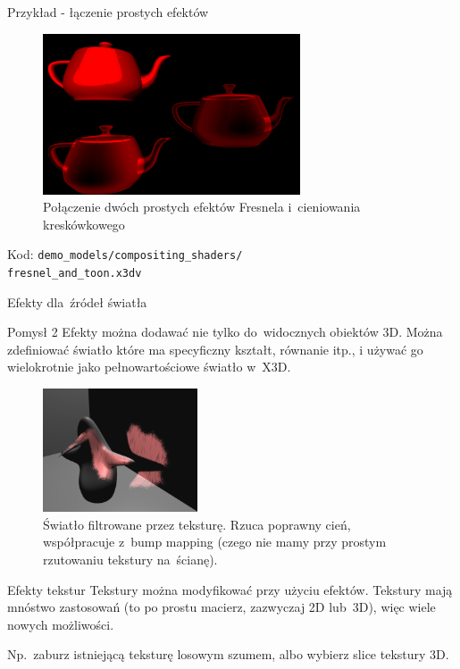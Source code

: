 \documentclass{beamer}
\begin{document}
\begin{frame}{Przykład - łączenie prostych efektów}
\begin{figure}
  \centering
  \includegraphics[width=3.0in]{../fresnel_and_toon}
  \caption{Połączenie dwóch prostych efektów Fresnela i~cieniowania kreskówkowego}
\end{figure}

Kod: \texttt{demo\_models/compositing\_shaders/\\fresnel\_and\_toon.x3dv}

\end{frame}

\begin{frame}{Efekty dla~źródeł światła}
\begin{block}{Pomysł 2}
Efekty można dodawać nie tylko do~widocznych obiektów 3D.
Można zdefiniować światło które ma specyficzny kształt, równanie itp.,
i używać go wielokrotnie jako pełnowartościowe światło w~X3D.
\end{block}

\begin{figure}
  \centering
  \includegraphics[width=1.8in]{../fancy_light_spot_shape}
  \caption{Światło filtrowane przez teksturę. Rzuca poprawny cień, współpracuje z~bump mapping (czego nie mamy przy prostym rzutowaniu tekstury na~ścianę).}
\end{figure}
\end{frame}

\begin{frame}[fragile]{Efekty tekstur}
Tekstury można modyfikować przy użyciu efektów. Tekstury mają mnóstwo
zastosowań (to po prostu macierz, zazwyczaj 2D lub~3D), więc wiele nowych
możliwości.

\vspace{0.1in}

Np.~zaburz istniejącą teksturę losowym szumem, albo wybierz slice tekstury 3D.
\end{frame}
\end{document}
